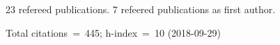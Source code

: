 23 refereed publications. 7 refeered publications as first author.

               Total citations~=~445; h-index~=~10 (2018-09-29)